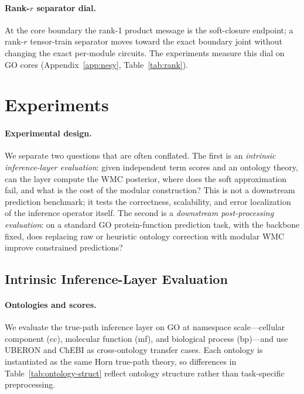 \documentclass[letterpaper]{article}
\begin{document}
\paragraph{Rank-$r$ separator dial.}
At the core boundary the rank-1 product message is the soft-closure endpoint; a rank-$r$ tensor-train separator moves toward the exact boundary joint without changing the exact per-module circuits. The experiments measure this dial on GO cores (Appendix~\ref{app:nesy}, Table~\ref{tab:rank}).

\section{Experiments}\label{sec:experiments}

\paragraph{Experimental design.}
We separate two questions that are often conflated. The first is an \emph{intrinsic inference-layer evaluation}: given independent term scores and an ontology theory, can the layer compute the WMC posterior, where does the soft approximation fail, and what is the cost of the modular construction? This is not a downstream prediction benchmark; it tests the correctness, scalability, and error localization of the inference operator itself. The second is a \emph{downstream post-processing evaluation}: on a standard GO protein-function prediction task, with the backbone fixed, does replacing raw or heuristic ontology correction with modular WMC improve constrained predictions?

\subsection{Intrinsic Inference-Layer Evaluation}\label{sec:intrinsic}
\paragraph{Ontologies and scores.}
We evaluate the true-path inference layer on GO \citep{ashburner2000go,geneontology2023} at namespace scale---cellular component (cc), molecular function (mf), and biological process (bp)---and use UBERON and ChEBI \citep{mungall2012uberon,hastings2016chebi} as cross-ontology transfer cases. Each ontology is instantiated as the same Horn true-path theory, so differences in Table~\ref{tab:ontology-struct} reflect ontology structure rather than task-specific preprocessing.
\end{document}
